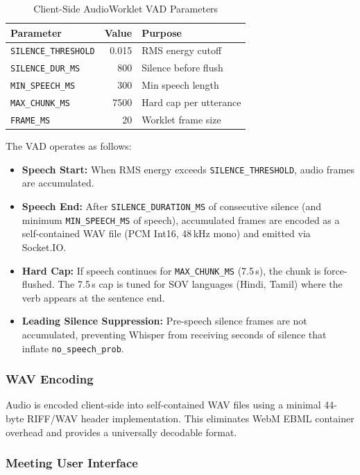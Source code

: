 \documentclass[conference]{IEEEtran}
\begin{document}
\begin{table}[htbp]
\centering
\caption{Client-Side AudioWorklet VAD Parameters}
\label{tab:clientvad}
\begin{tabular}{lrl}
\toprule
\textbf{Parameter} & \textbf{Value} & \textbf{Purpose} \\
\midrule
\texttt{SILENCE\_THRESHOLD} & 0.015 & RMS energy cutoff \\
\texttt{SILENCE\_DUR\_MS} & 800 & Silence before flush \\
\texttt{MIN\_SPEECH\_MS} & 300 & Min speech length \\
\texttt{MAX\_CHUNK\_MS} & 7500 & Hard cap per utterance \\
\texttt{FRAME\_MS} & 20 & Worklet frame size \\
\bottomrule
\end{tabular}
\end{table}

The VAD operates as follows:
\begin{itemize}
  \item \textbf{Speech Start:} When RMS energy exceeds \texttt{SILENCE\_THRESHOLD}, audio frames are accumulated.
  \item \textbf{Speech End:} After \texttt{SILENCE\_DURATION\_MS} of consecutive silence (and minimum \texttt{MIN\_SPEECH\_MS} of speech), accumulated frames are encoded as a self-contained WAV file (PCM Int16, 48\,kHz mono) and emitted via Socket.IO.
  \item \textbf{Hard Cap:} If speech continues for \texttt{MAX\_CHUNK\_MS} (7.5\,s), the chunk is force-flushed. The 7.5\,s cap is tuned for SOV languages (Hindi, Tamil) where the verb appears at the sentence end.
  \item \textbf{Leading Silence Suppression:} Pre-speech silence frames are not accumulated, preventing Whisper from receiving seconds of silence that inflate \texttt{no\_speech\_prob}.
\end{itemize}

\subsubsection{WAV Encoding}

Audio is encoded client-side into self-contained WAV files using a minimal 44-byte RIFF/WAV header implementation. This eliminates WebM EBML container overhead and provides a universally decodable format.

\subsubsection{Meeting User Interface}
\end{document}
